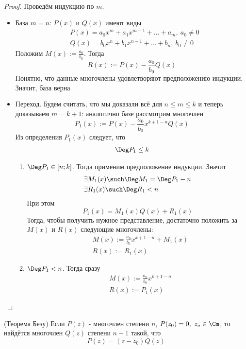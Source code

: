 \begin{proof}
	Проведём индукцию по $m$.
	\begin{itemize}
		\item База $m = n$: $P(x)$ и $Q(x)$ имеют виды
		\begin{align*}
			&{P(x) = a_0 x^m + a_1 x^{m - 1} + \ldots + a_m,\ a_0 \neq 0}
			\\
			&{Q(x) = b_0 x^n + b_1 x^{n - 1} + \ldots + b_n,\ b_0 \neq 0}
		\end{align*}
		Положим $M(x) := \frac{a_0}{b_0}$. Тогда 
		\[
			R(x) := P(x) - \frac{a_0}{b_0}Q(x)
		\]
		Понятно, что данные многочлены удовлетворяют предположению индукции. Значит, база верна
		
		\item Переход. Будем считать, что мы доказали всё для $n \le m \le k$ и теперь доказываем $m = k + 1$: аналогично базе рассмотрим многочлен
		\[
			P_1(x) := P(x) - \frac{a_0}{b_0}x^{k + 1 - n} Q(x)
		\]
		Из определения $P_1(x)$ следует, что
		\[
			\Deg P_1 \le k
		\]
		\begin{enumerate}
			\item $\Deg P_1 \in [n; k]$. Тогда применим предположение индукции. Значит
			\begin{align*}
				&{\exists M_1(x) \such \Deg M_1 = \Deg P_1 - n}
				\\
				&{\exists R_1(x) \such \Deg R_1 < n}
			\end{align*}
			При этом
			\[
				P_1(x) = M_1(x)Q(x) + R_1(x)
			\]
			Тогда, чтобы получить нужное представление, достаточно положить за $M(x)$ и $R(x)$ следующие многочлены:
			\begin{align*}
				&{M(x) := \frac{a_0}{b_0}x^{k + 1 - n} + M_1(x)}
				\\
				&{R(x) := R_1(x)}
			\end{align*}
			
			\item $\Deg P_1 < n$. Тогда сразу
			\begin{align*}
			&{M(x) := \frac{a_0}{b_0}x^{k + 1 - n}}
			\\
			&{R(x) := P_1(x)}
			\end{align*}
		\end{enumerate}
	\end{itemize}
\end{proof}

\begin{theorem} (Теорема Безу)
	Если $P(z)$ - многочлен степени $n$, $P(z_0) = 0,\ z_o \in \Cm$, то найдётся многочлен $Q(z)$ степени $n - 1$ такой, что
	\[
		P(z) = (z - z_0)Q(z)
	\]
\end{theorem}

